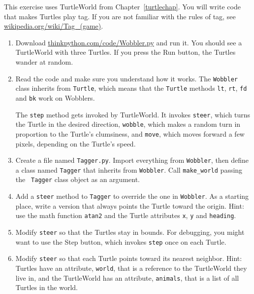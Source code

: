 \documentclass[10pt]{book}
\begin{document}
\begin{ex}


This exercise uses TurtleWorld from Chapter~\ref{turtlechap}.
You will write code that makes Turtles play tag.  If you
are not familiar with the rules of tag, see
\url{wikipedia.org/wiki/Tag_(game)}.

\begin{enumerate}

\item Download \url{thinkpython.com/code/Wobbler.py} and run it.  You
should see a TurtleWorld with three Turtles.  If you press the
{\sf Run} button, the Turtles wander at random.

\item Read the code and make sure you understand how it works.
The {\tt Wobbler} class inherits from {\tt Turtle}, which means
that the {\tt Turtle} methods {\tt lt}, {\tt rt}, {\tt fd}
and {\tt bk} work on Wobblers.

The {\tt step} method gets invoked by TurtleWorld.  It invokes 
{\tt steer}, which turns the Turtle in the desired direction,
{\tt wobble}, which makes a random turn in proportion to the Turtle's
clumsiness, and {\tt move}, which moves forward a few pixels,
depending on the Turtle's speed.


\item Create a file named {\tt Tagger.py}.  Import everything from
  {\tt Wobbler}, then define a class named {\tt Tagger} that inherits
  from {\tt Wobbler}.  Call \verb"make_world" passing the {\tt
    Tagger} class object as an argument.

\item Add a {\tt steer} method to {\tt Tagger} to override the one in
  {\tt Wobbler}.  As a starting place, write a version that always
  points the Turtle toward the origin.  Hint: use the math function
  {\tt atan2} and the Turtle attributes {\tt x}, {\tt y} and
  {\tt heading}.

\item Modify {\tt steer} so that the Turtles stay in bounds.
  For debugging, you might want to use the {\sf Step} button,
  which invokes {\tt step} once on each Turtle.

\item Modify {\tt steer} so that each Turtle points toward its nearest
  neighbor.  Hint: Turtles have an attribute, {\tt world}, that is a
  reference to the TurtleWorld they live in, and the TurtleWorld has
  an attribute, {\tt animals}, that is a list of all Turtles in the
  world.


\end{enumerate}
\end{ex}
\end{document}
